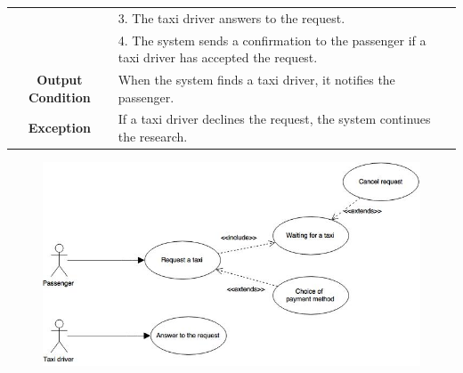 \documentclass[18pt,oneside,a4paper, titlepage]{article}
\begin{document}
\begin{itemize}
\begin{center}
\begin{tabular}{|c|p{8cm}|}
					& 3. The taxi driver answers to the request.\\
					& 4. The system sends a confirmation to the passenger if a taxi driver has accepted the request. \\
					\hline \textbf{Output Condition} & When the system finds a taxi driver, it notifies the passenger.\\
					\hline \textbf{Exception} & If a taxi driver declines the request, the system continues the research.\\
					\hline
				\end{tabular}
				\vspace{1cm}
				\begin{figure}[h]
					\centering
					\includegraphics[scale=0.6]{UseCaseRequest.jpg}
				\end{figure}
			\end{center}
			
			\newpage
			

\end{itemize}
\end{document}
